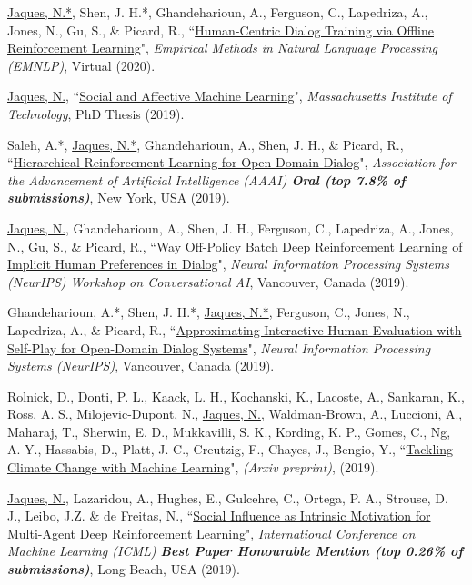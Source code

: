 \documentclass[paper=letter,fontsize=11pt]{scrartcl} %
\newcommand{\PaperEntry}[6]{
		\noindent #1, ``\href{#6}{#2}", \textit{#3}, #4 (#5).}
\begin{document}
\begin{etaremune}
\item \PaperEntry{\underline{Jaques, N.*}, Shen, J. H.*, Ghandeharioun, A., Ferguson, C., Lapedriza, A., Jones, N., Gu, S., \& Picard, R.}{Human-Centric Dialog Training via Offline Reinforcement Learning}{Empirical Methods in Natural Language Processing (EMNLP)}{Virtual}{2020}{https://arxiv.org/pdf/2010.05848.pdf}

\item \PaperEntry{\underline{Jaques, N.}}{Social and Affective Machine Learning}{Massachusetts Institute of Technology}{PhD Thesis}{2019}{https://www.media.mit.edu/publications/social-and-affective-machine-learning/}

\item \PaperEntry{Saleh, A.*, \underline{Jaques, N.*}, Ghandeharioun, A., Shen, J. H., \& Picard, R.}{Hierarchical Reinforcement Learning for Open-Domain Dialog}{Association for the Advancement of Artificial Intelligence (AAAI) \textbf{Oral (top 7.8\% of submissions)}}{New York, USA}{2019}{https://arxiv.org/abs/1909.07547}

\item \PaperEntry{\underline{Jaques, N.}, Ghandeharioun, A., Shen, J. H., Ferguson, C., Lapedriza, A., Jones, N., Gu, S., \& Picard, R.}{Way Off-Policy Batch Deep Reinforcement Learning of Implicit Human Preferences in Dialog}{Neural Information Processing Systems (NeurIPS) Workshop on Conversational AI}{Vancouver, Canada}{2019}{https://arxiv.org/abs/1907.00456}

\item \PaperEntry{Ghandeharioun, A.*, Shen, J. H.*, \underline{Jaques, N.*}, Ferguson, C., Jones, N., Lapedriza, A., \& Picard, R.}{Approximating Interactive Human Evaluation with Self-Play for Open-Domain Dialog Systems}{Neural Information Processing Systems (NeurIPS)}{Vancouver, Canada}{2019}{https://arxiv.org/abs/1906.09308}

\item \PaperEntry{Rolnick, D., Donti, P. L., Kaack, L. H., Kochanski, K., Lacoste, A., Sankaran, K., Ross, A. S., Milojevic-Dupont, N., \underline{Jaques, N.}, Waldman-Brown, A., Luccioni, A., Maharaj, T., Sherwin, E. D., Mukkavilli, S. K., Kording, K. P., Gomes, C., Ng, A. Y., Hassabis, D., Platt, J. C., Creutzig, F., Chayes, J., Bengio, Y.}{Tackling Climate Change with Machine Learning}{(Arxiv preprint)}{}{2019}{https://arxiv.org/abs/1906.05433}

\item \PaperEntry{\underline{Jaques, N.}, Lazaridou, A., Hughes, E., Gulcehre, C., Ortega, P. A., Strouse, D. J., Leibo, J.Z. \& de Freitas, N.}{Social Influence as Intrinsic Motivation for Multi-Agent Deep Reinforcement Learning}{International Conference on Machine Learning (ICML) \textbf{Best Paper Honourable Mention (top 0.26\% of submissions)}}{Long Beach, USA}{2019}{https://arxiv.org/pdf/1810.08647.pdf}


\end{etaremune}
\end{document}
